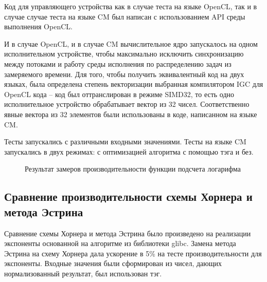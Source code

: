 Код для управляющего устройства как в случае теста на языке OpenCL, так и в случае случае теста на языке CM был написан с использованием API среды выполнения OpenCL.

И в случае OpenCL, и в случае CM вычислительное ядро запускалось на одном исполнительном устройстве, чтобы максимально исключить синхронизацию между потоками и работу среды исполнения по распределению задач из замеряемого времени.
Для того, чтобы получить эквивалентный код на двух языках, была определена степень векторизации выбранная компилятором IGC для OpenCL кода -- код был оттранслирован в режиме SIMD32, то есть одно исполнительное устройство обрабатывает вектор из 32 чисел.
Соответственно явные вектора из 32 элементов были использованы в коде, написанном на языке CM.

Тесты запускались с различными входными значениями.
Тесты на языке CM запускались в двух режимах: с оптимизацией алгоритма с помощью тэга и без.

\begin{figure}[h]
  \centering
  \caption{Результат замеров производительности функции подсчета логарифма}
  \label{hist:log:perf}
\end{figure}

\subsection{Сравнение производительности схемы Хорнера и метода Эстрина}

Сравнение схемы Хорнера и метода Эстрина было произведено на реализации экспоненты основанной на алгоритме из библиотеки glibc.
Замена метода Эстрина на схему Хорнера дала ускорение в 5\% на тесте производительности для экспоненты.
Входные значения были сформирован из чисел, дающих нормализованный результат, был использован тэг.

